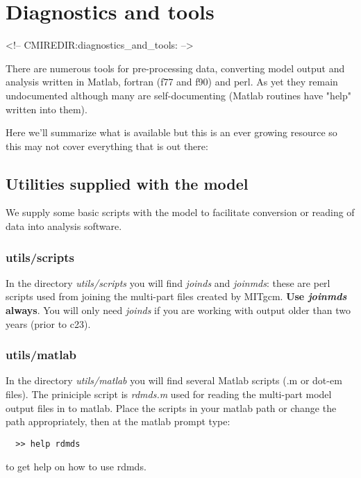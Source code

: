 
\chapter{Diagnostics and tools}
\begin{rawhtml}
<!-- CMIREDIR:diagnostics_and_tools: -->
\end{rawhtml}

There are numerous tools for pre-processing data, converting model
output and analysis written in Matlab, fortran (f77 and f90) and perl.
As yet they remain undocumented although many are self-documenting
(Matlab routines have "help" written into them).

Here we'll summarize what is available but this is an ever growing resource
so this may not cover everything that is out there:

\section{Utilities supplied with the model}

We supply some basic scripts with the model to facilitate conversion or reading
of data into analysis software.

\subsection{utils/scripts}

In the directory {\em utils/scripts} you will find {\em joinds} and {\em joinmds}:
these are perl scripts used from joining the multi-part files created by
MITgcm. {\bf Use {\em joinmds} always}. You will only need {\em joinds} if you
are working with output older than two years (prior to c23).

\subsection{utils/matlab}

In the directory {\em utils/matlab} you will find several Matlab scripts
(.m or dot-em files). The priniciple script is {\em rdmds.m} used for reading
the multi-part model output files in to matlab. Place the scripts in your
matlab path or change the path appropriately, then at the matlab prompt type:
\begin{verbatim}
  >> help rdmds
\end{verbatim}
to get help on how to use rdmds.

